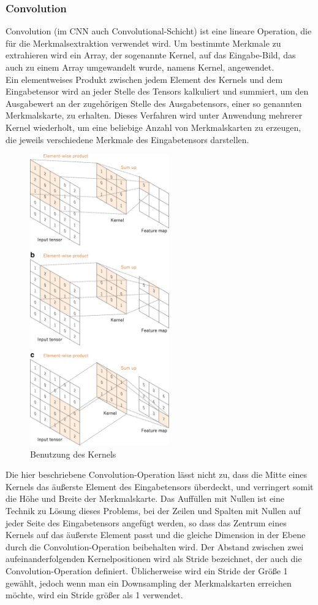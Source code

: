 \documentclass[paper=A4,pagesize=auto,12pt,headinclude=true,footinclude=true,BCOR=0mm,DIV=calc]{scrartcl}
\begin{document}
\subsubsection{Convolution}
Convolution (im CNN auch Convolutional-Schicht) ist eine lineare Operation, die für die Merkmalsextraktion verwendet wird. Um bestimmte Merkmale zu extrahieren wird ein Array, der sogenannte Kernel, auf das Eingabe-Bild, das auch zu einem Array umgewandelt wurde, namens Kernel, angewendet.\\
Ein elementweises Produkt zwischen jedem Element des Kernels und dem Eingabetensor wird an jeder Stelle des Tensors kalkuliert und summiert, um den Ausgabewert an der zugehörigen Stelle des Ausgabetensors, einer so genannten Merkmalskarte, zu erhalten. Dieses Verfahren wird unter Anwendung mehrerer Kernel wiederholt, um eine beliebige Anzahl von Merkmalskarten zu erzeugen, die jeweils verschiedene Merkmale des Eingabetensors darstellen.\\
\begin{figure}
	\centering
	\includegraphics[width=6cm]{"images/cnn.png"}
	\caption{Benutzung des Kernels \cite{cnn2}}
	\label{useofkernel}
\end{figure}
Die hier beschriebene Convolution-Operation lässt nicht zu, dass die Mitte eines Kernels das äußerste Element des Eingabetensors überdeckt, und verringert somit die Höhe und Breite der Merkmalskarte. Das Auffüllen mit Nullen ist eine Technik zu Lösung dieses Problems, bei der Zeilen und Spalten mit Nullen auf jeder Seite des Eingabetensors angefügt werden, so dass das Zentrum eines Kernels auf das äußerste Element passt und die gleiche Dimension in der Ebene durch die Convolution-Operation beibehalten wird. Der Abstand zwischen zwei aufeinanderfolgenden Kernelpositionen wird als Stride bezeichnet, der auch die Convolution-Operation definiert. Üblicherweise wird ein Stride der Größe 1 gewählt, jedoch wenn man ein Downsampling  der Merkmalskarten erreichen möchte, wird ein Stride größer als 1 verwendet.
\end{document}
